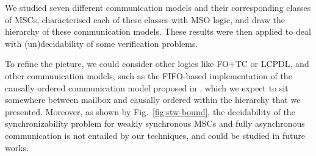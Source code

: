 We studied seven different communication models
and their corresponding classes of MSCs, characterised 
each of these classes with MSO logic, and draw the hierarchy of these communication models. These 
results were then applied to deal with (un)decidability of some 
verification problems. 

To refine the picture, we could
consider other logics like FO+TC or LCPDL, and other communication models, 
such as the FIFO-based implementation of the causally ordered 
communication model proposed in 
\cite{DBLP:conf/dagstuhl/MatternF94}, which we expect to sit somewhere between mailbox and causally ordered within the hierarchy that we presented. 
Moreover, as shown by Fig.~\ref{fig:stw-bound}, the 
decidability of the synchronizability problem for weakly 
synchronous MSCs and fully asynchronous communication is not entailed by our techniques, and could be studied in future works.